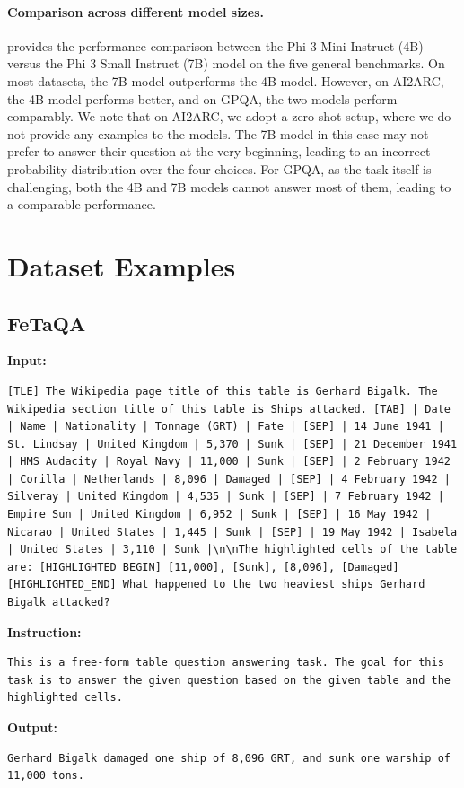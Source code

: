 \documentclass[11pt]{article}
\begin{document}
\paragraph{Comparison across different model sizes.}
 provides the performance comparison between the Phi 3 Mini Instruct (4B) versus the Phi 3 Small Instruct (7B) model on the five general benchmarks.
On most datasets, the 7B model outperforms the 4B model.
However, on AI2ARC, the 4B model performs better, and on GPQA, the two models perform comparably.
We note that on AI2ARC, we adopt a zero-shot setup, where we do not provide any examples to the models.
The 7B model in this case may not prefer to answer their question at the very beginning, leading to an incorrect probability distribution over the four choices.
For GPQA, as the task itself is challenging, both the 4B and 7B models cannot answer most of them, leading to a comparable performance.

\section{Dataset Examples}
\label{app-sec: dataset-examples}

\subsection{FeTaQA}

\textbf{Input:}
\begin{lstlisting}
[TLE] The Wikipedia page title of this table is Gerhard Bigalk. The Wikipedia section title of this table is Ships attacked. [TAB] | Date | Name | Nationality | Tonnage (GRT) | Fate | [SEP] | 14 June 1941 | St. Lindsay | United Kingdom | 5,370 | Sunk | [SEP] | 21 December 1941 | HMS Audacity | Royal Navy | 11,000 | Sunk | [SEP] | 2 February 1942 | Corilla | Netherlands | 8,096 | Damaged | [SEP] | 4 February 1942 | Silveray | United Kingdom | 4,535 | Sunk | [SEP] | 7 February 1942 | Empire Sun | United Kingdom | 6,952 | Sunk | [SEP] | 16 May 1942 | Nicarao | United States | 1,445 | Sunk | [SEP] | 19 May 1942 | Isabela | United States | 3,110 | Sunk |\n\nThe highlighted cells of the table are: [HIGHLIGHTED_BEGIN] [11,000], [Sunk], [8,096], [Damaged] [HIGHLIGHTED_END] What happened to the two heaviest ships Gerhard Bigalk attacked?
\end{lstlisting}

\textbf{Instruction:}
\begin{lstlisting}
This is a free-form table question answering task. The goal for this task is to answer the given question based on the given table and the highlighted cells.
\end{lstlisting}
\textbf{Output:}
\begin{lstlisting}
Gerhard Bigalk damaged one ship of 8,096 GRT, and sunk one warship of 11,000 tons.
\end{lstlisting}
\end{document}

